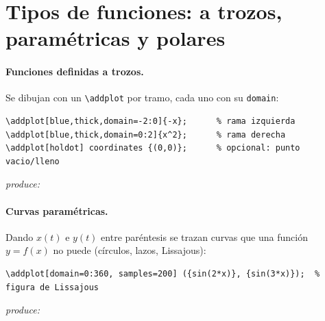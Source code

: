 \documentclass[11pt,a4paper]{article}
\newcommand{\C}[1]{\texttt{\textbackslash #1}}
\newcommand{\produce}{\par\smallskip\noindent\textit{produce:}\par\smallskip}
\begin{document}
\section{Tipos de funciones: a trozos, paramétricas y polares}
\paragraph{Funciones definidas a trozos.} Se dibujan con un \C{addplot} por tramo,
cada uno con su \texttt{domain}:
\begin{lstlisting}
\addplot[blue,thick,domain=-2:0]{-x};      % rama izquierda
\addplot[blue,thick,domain=0:2]{x^2};      % rama derecha
\addplot[holdot] coordinates {(0,0)};      % opcional: punto vacio/lleno
\end{lstlisting}
\produce
\begin{center}
\end{center}

\paragraph{Curvas paramétricas.} Dando $x(t)$ e $y(t)$ entre paréntesis se trazan
curvas que una función $y=f(x)$ no puede (círculos, lazos, Lissajous):
\begin{lstlisting}
\addplot[domain=0:360, samples=200] ({sin(2*x)}, {sin(3*x)});  % figura de Lissajous
\end{lstlisting}
\produce
\begin{center}
\end{center}
\end{document}
